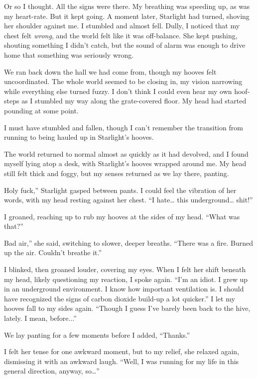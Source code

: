 Or so I thought. All the signs were there. My breathing was speeding up, as was my heart-rate. But it kept going. A moment later, Starlight had turned, shoving her shoulder against me. I stumbled and almost fell. Dully, I noticed that my chest felt \textit{wrong}, and the world felt like it was off-balance. She kept pushing, shouting something I didn’t catch, but the sound of alarm was enough to drive home that something was seriously wrong.

We ran back down the hall we had come from, though my hooves felt uncoordinated. The whole world seemed to be closing in, my vision narrowing while everything else turned fuzzy. I don’t think I could even hear my own hoof-steps as I stumbled my way along the grate-covered floor. My head had started pounding at some point.

I must have stumbled and fallen, though I can’t remember the transition from running to being hauled up in Starlight’s hooves.

The world returned to normal almost as quickly as it had devolved, and I found myself lying atop a desk, with Starlight’s hooves wrapped around me. My head still felt thick and foggy, but my senses returned as we lay there, panting.

\leavevmode{}Holy fuck,” Starlight gasped between pants. I could feel the vibration of her words, with my head resting against her chest. “I hate… this underground… shit!”

I groaned, reaching up to rub my hooves at the sides of my head. “What was that?”

\leavevmode{}Bad air,” she said, switching to slower, deeper breaths. “There was a fire. Burned up the air. Couldn’t breathe it.”

I blinked, then groaned louder, covering my eyes. When I felt her shift beneath my head, likely questioning my reaction, I spoke again. “I’m an idiot. I grew up in an underground environment. I know how important ventilation is. I should have recognized the signs of carbon dioxide build-up a lot quicker.” I let my hooves fall to my sides again. “Though I guess I’ve barely been back to the hive, lately. I mean, before...”

We lay panting for a few moments before I added, “Thanks.”

I felt her tense for one awkward moment, but to my relief, she relaxed again, dismissing it with an awkward laugh. “Well, I was running for my life in this general direction, anyway, so…”

